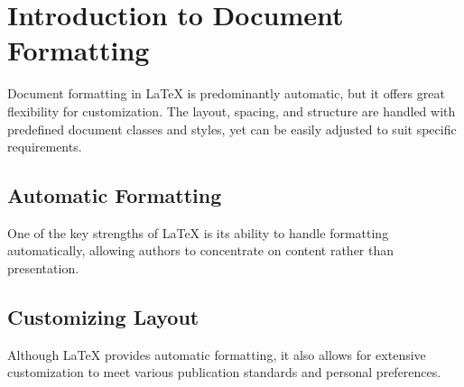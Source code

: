 \section{Introduction to Document Formatting}
\label{sec:document-formatting}

Document formatting in LaTeX is predominantly automatic, but it offers great flexibility for customization. The layout, spacing, and structure are handled with predefined document classes and styles, yet can be easily adjusted to suit specific requirements.

\subsection{Automatic Formatting}
One of the key strengths of LaTeX is its ability to handle formatting automatically, allowing authors to concentrate on content rather than presentation.

\subsection{Customizing Layout}
Although LaTeX provides automatic formatting, it also allows for extensive customization to meet various publication standards and personal preferences.

